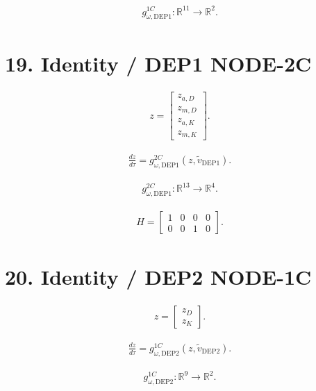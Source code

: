 \documentclass[11pt]{article}
\begin{document}
\begin{align}
\boxed{
g_{\omega,\mathrm{DEP1}}^{1C}:
\mathbb R^{11}\rightarrow\mathbb R^2.
}
\tag{N3.56}
\end{align}

\section*{19. Identity / DEP1 NODE-2C}

\begin{align}
\boxed{
z=
\begin{bmatrix}
z_{a,D}\\
z_{m,D}\\
z_{a,K}\\
z_{m,K}
\end{bmatrix}.
}
\tag{N3.57}
\end{align}

\begin{align}
\boxed{
\frac{dz}{d\tau}
=
g_{\omega,\mathrm{DEP1}}^{2C}
(z,\widetilde v_{\mathrm{DEP1}}).
}
\tag{N3.58}
\end{align}

\begin{align}
\boxed{
g_{\omega,\mathrm{DEP1}}^{2C}:
\mathbb R^{13}\rightarrow\mathbb R^4.
}
\tag{N3.59}
\end{align}

\begin{align}
\boxed{
H=
\begin{bmatrix}
1&0&0&0\\
0&0&1&0
\end{bmatrix}.
}
\tag{N3.60}
\end{align}

\section*{20. Identity / DEP2 NODE-1C}

\begin{align}
\boxed{
z=
\begin{bmatrix}
z_D\\
z_K
\end{bmatrix}.
}
\tag{N3.61}
\end{align}

\begin{align}
\boxed{
\frac{dz}{d\tau}
=
g_{\omega,\mathrm{DEP2}}^{1C}
(z,\widetilde v_{\mathrm{DEP2}}).
}
\tag{N3.62}
\end{align}

\begin{align}
\boxed{
g_{\omega,\mathrm{DEP2}}^{1C}:
\mathbb R^{9}\rightarrow\mathbb R^2.
}
\tag{N3.63}
\end{align}
\end{document}
